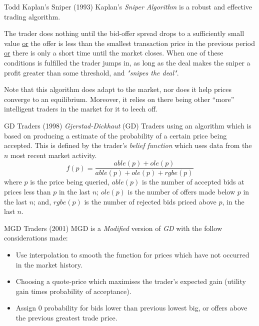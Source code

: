 \documentclass[11pt,a4paper]{article}
\begin{document}
\begin{proposition}{Todd Kaplan's Sniper (1993)}
  Kaplan's \textit{Sniper Algorithm} is a robust and effective trading algorithm.
  \par The trader does nothing until the bid-offer spread drops to a sufficiently small value \underline{or} the offer is less than the smallest transaction price in the previous period \underline{or} there is only a short time until the market closes. When one of these conditions is fulfilled the trader jumps in, as long as the deal makes the sniper a profit greater than some threshold, and \textit{"snipes the deal"}.
  \par Note that this algorithm does adapt to the market, nor does it help prices converge to an equilibrium. Moreover, it relies on there being other ``more'' intelligent traders in the market for it to leech off.
\end{proposition}

\begin{proposition}{GD Traders (1998)}
  \textit{Gjerstad-Dickhaut} (GD) Traders using an algorithm which is based on producing a estimate of the probability of a certain price being accepted. This is defined by the trader's \textit{belief function} which uses data from the $n$ most recent market activity.
  \[ f(p)=\frac{able(p)+ole(p)}{able(p)+ole(p)+rgbe(p)} \]
  where $p$ is the price being queried, $able(p)$ is the number of accepted bids at prices less than $p$ in the last $n$; $ole(p)$ is the number of offers made below $p$ in the last $n$; and, $rgbe(p)$ is the number of rejected bids priced above $p$, in the last $n$.
\end{proposition}

\begin{proposition}{MGD Traders (2001)}
  MGD is a \textit{Modified} version of \textit{GD} with the follow considerations made:
  \begin{itemize}
    \item Use interpolation to smooth the function for prices which have not occurred in the market history.
    \item Choosing a quote-price which maximises the trader's expected gain (utility gain times probability of acceptance).
    \item Assign 0 probability for bids lower than previous lowest big, or offers above the previous greatest trade price.
  \end{itemize}
\end{proposition}
\end{document}
